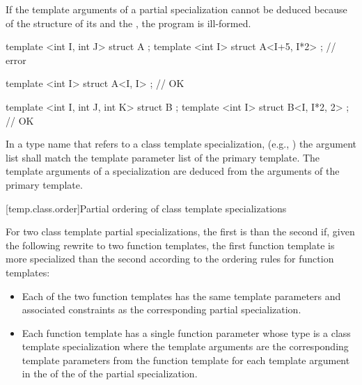 \pnum
If the template arguments of a partial specialization cannot be deduced
because of the structure of its 
and the ,
the program is ill-formed.
\begin{example}
\begin{codeblock}
template <int I, int J> struct A {};
template <int I> struct A<I+5, I*2> {};     // error

template <int I> struct A<I, I> {};         // OK

template <int I, int J, int K> struct B {};
template <int I> struct B<I, I*2, 2> {};    // OK
\end{codeblock}
\end{example}

\pnum
In a type name that refers to a class template specialization, (e.g.,
)
the argument list shall match the template parameter list of the primary
template.
The template arguments of a specialization are deduced from the arguments
of the primary template.

[temp.class.order]{Partial ordering of class template specializations}

\pnum
{}%
For two class template partial specializations,
the first is  than the second if, given the following
rewrite to two function templates, the first function template is more
specialized than the second according to the ordering rules for function
templates:

\begin{itemize}
\item
Each of the two
function templates has the same template parameters
and associated constraints
as the corresponding partial specialization.
\item
Each function template
has a single function parameter
whose type is a class template specialization where the template arguments
are the corresponding template parameters from the function template
for each template argument
in the 
of the 
of the partial specialization.
\end{itemize}

